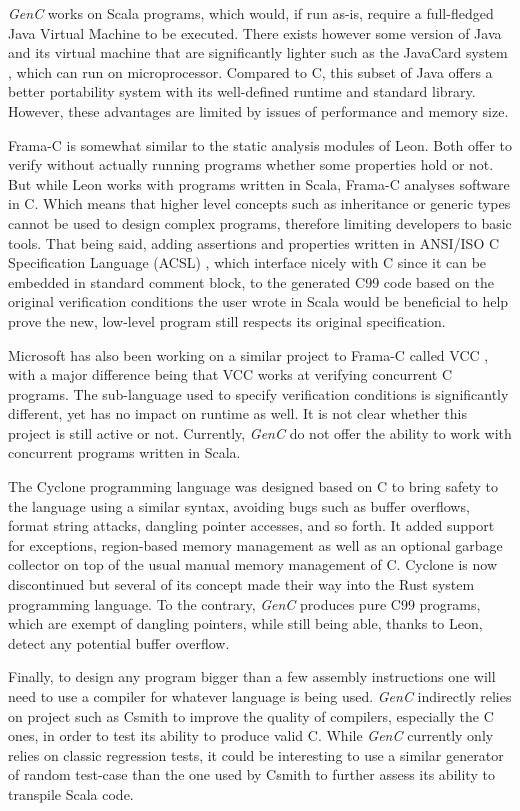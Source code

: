 \documentclass[a4paper,twoside]{article}
\newcommand{\GenC}{\emph{GenC}\xspace}
\begin{document}
\GenC works on Scala programs, which would, if run as-is, require a full-fledged
Java Virtual Machine to be executed. There exists however some version of Java
and its virtual machine that are significantly lighter such as the JavaCard
system \cite{javacard}, which can run on microprocessor. Compared to C, this
subset of Java offers a better portability system with its well-defined runtime
and standard library. However, these advantages are limited by issues of
performance and memory size.

Frama-C \cite{framac} is somewhat similar to the static analysis modules of
Leon. Both offer to verify without actually running programs whether some
properties hold or not. But while Leon works with programs written in Scala,
Frama-C analyses software in C. Which means that higher level concepts such as
inheritance or generic types cannot be used to design complex programs,
therefore limiting developers to basic tools. That being said, adding assertions
and properties written in ANSI/ISO C Specification Language (ACSL) \cite{acsl},
which interface nicely with C since it can be embedded in standard comment
block, to the generated C99 code based on the original verification conditions
the user wrote in Scala would be beneficial to help prove the new, low-level
program still respects its original specification.

Microsoft has also been working on a similar project to Frama-C called VCC
\cite{vcc}, with a major difference being that VCC works at verifying concurrent
C programs. The sub-language used to specify verification conditions is
significantly different, yet has no impact on runtime as well. It is not clear
whether this project is still active or not. Currently, \GenC do not offer the
ability to work with concurrent programs written in Scala.

The Cyclone programming language \cite{cyclone} was designed based on C to bring
safety to the language using a similar syntax, avoiding bugs such as buffer
overflows, format string attacks, dangling pointer accesses, and so forth. It
added support for exceptions, region-based memory management as well as an
optional garbage collector on top of the usual manual memory management of C.
Cyclone is now discontinued but several of its concept made their way into the
Rust system programming language. To the contrary, \GenC produces pure C99
programs, which are exempt of dangling pointers, while still being able, thanks
to Leon, detect any potential buffer overflow.

Finally, to design any program bigger than a few assembly instructions one will
need to use a compiler for whatever language is being used. \GenC indirectly
relies on project such as Csmith \cite{csmith} to improve the quality of
compilers, especially the C ones, in order to test its ability to produce valid
C. While \GenC currently only relies on classic regression tests, it could be
interesting to use a similar generator of random test-case than the one used by
Csmith to further assess its ability to transpile Scala code.
\end{document}
